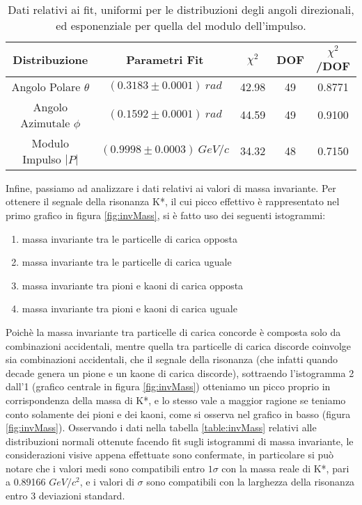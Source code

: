 \documentclass{article}
\begin{document}
\begin{table}[h]
    \centering
    \begin{tabular}{||c|c|c|c|c||}
        \hline
        Distribuzione & Parametri Fit & $\chi^2$ & DOF & $\chi^2$/DOF \\
        \hline \hline
        Angolo Polare $\theta$ & $(0.3183 \pm 0.0001)\ rad$ & 42.98 & 49 & 0.8771 \\
        \hline
        Angolo Azimutale $\phi$ & $(0.1592 \pm 0.0001)\ rad$ & 44.59 & 49 & 0.9100 \\
        \hline
        Modulo Impulso $|P|$ & $(0.9998 \pm 0.0003)\ GeV/c$ & 34.32 & 48 & 0.7150 \\
        \hline
    \end{tabular}
    \caption{Dati relativi ai fit, uniformi per le distribuzioni degli angoli direzionali, ed esponenziale per quella del modulo dell'impulso.}
    \label{table:impulso}
\end{table}

Infine, passiamo ad analizzare i dati relativi ai valori di massa invariante. Per ottenere il segnale della risonanza K*, il cui picco effettivo è rappresentato nel primo grafico in figura \ref{fig:invMass}, si è fatto uso dei seguenti istogrammi:
\begin{enumerate}
    \item massa invariante tra le particelle di carica opposta
    \item massa invariante tra le particelle di carica uguale
    \item massa invariante tra pioni e kaoni di carica opposta
    \item massa invariante tra pioni e kaoni di carica uguale
\end{enumerate}
Poichè la massa invariante tra particelle di carica concorde è composta solo da combinazioni accidentali, mentre quella tra particelle di carica discorde coinvolge sia combinazioni accidentali, che il segnale della risonanza (che infatti quando decade genera un pione e un kaone di carica discorde), sottraendo l'istogramma 2 dall'1 (grafico centrale in figura \ref{fig:invMass}) otteniamo un picco proprio in corrispondenza della massa di K*, e lo stesso vale a maggior ragione se teniamo conto solamente dei pioni e dei kaoni, come si osserva nel grafico in basso (figura \ref{fig:invMass}). Osservando i dati nella tabella \ref{table:invMass} relativi alle distribuzioni normali ottenute facendo fit sugli istogrammi di massa invariante, le considerazioni visive appena effettuate sono confermate, in particolare si può notare che i valori medi sono compatibili entro $1\sigma$ con la massa reale di K*, pari a 0.89166 $GeV/c^2$, e i valori di $\sigma$ sono compatibili con la larghezza della risonanza entro 3 deviazioni standard.
\end{document}
